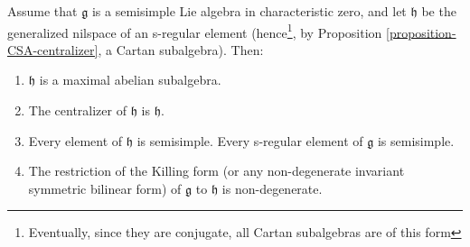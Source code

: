 \begin{proposition}
\label{proposition-CSA-semisimple}
 Assume that $\mathfrak g$ is a semisimple  Lie algebra in characteristic zero, and let $\mathfrak h$ be the generalized nilspace of an s-regular element (hence\footnote{Eventually, since they are conjugate, all Cartan subalgebras are of this form}, by Proposition \ref{proposition-CSA-centralizer}, a Cartan subalgebra). Then:
\begin{enumerate}
 \item $\mathfrak h$ is a maximal abelian subalgebra.
 \item The centralizer of $\mathfrak h$ is $\mathfrak h$.
 \item Every element of $\mathfrak h$ is semisimple. Every s-regular element of $\mathfrak g$ is semisimple.
 \item \label{Killingrestriction} The restriction of the Killing form (or any non-degenerate invariant symmetric bilinear form) of $\mathfrak g$ to $\mathfrak h$ is non-degenerate.
\end{enumerate}
\end{proposition}

